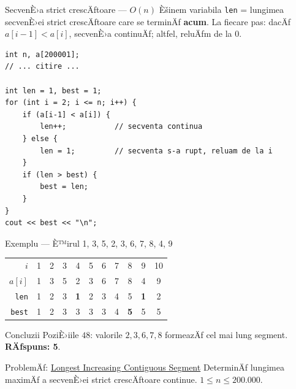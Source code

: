 \documentclass{beamer}
\begin{document}
\begin{frame}{SecvenÈ›a strict crescÄƒtoare --- $O(n)$}
  Èšinem variabila \texttt{len} = lungimea secvenÈ›ei strict crescÄƒtoare care se terminÄƒ \textbf{acum}.
  La fiecare pas: dacÄƒ $a[i-1] < a[i]$, secvenÈ›a continuÄƒ; altfel, reluÄƒm de la 0.
  \begin{lstlisting}
int n, a[200001];
// ... citire ...

int len = 1, best = 1;
for (int i = 2; i <= n; i++) {
    if (a[i-1] < a[i]) {
        len++;           // secventa continua
    } else {
        len = 1;         // secventa s-a rupt, reluam de la i
    }
    if (len > best) {
        best = len;
    }
}
cout << best << "\n";
  \end{lstlisting}
\end{frame}

\begin{frame}{Exemplu --- È™irul 1, 3, 5, 2, 3, 6, 7, 8, 4, 9}
  \begin{center}
  \footnotesize
  \begin{tabular}{r|cccccccccc}
    \toprule
    $i$           & 1 & 2 & 3 & 4          & 5 & 6 & 7 & 8          & 9          & 10 \\
    $a[i]$        & 1 & 3 & 5 & 2          & 3 & 6 & 7 & 8          & 4          & 9  \\
    \texttt{len}  & 1 & 2 & 3 & \textbf{1} & 2 & 3 & 4 & 5          & \textbf{1} & 2  \\
    \texttt{best} & 1 & 2 & 3 & 3          & 3 & 3 & 4 & \textbf{5} & 5          & 5  \\
    \bottomrule
  \end{tabular}
  \end{center}
  \begin{block}{Concluzii}
    PoziÈ›iile $4$\textendash$8$: valorile $2, 3, 6, 7, 8$ formeazÄƒ cel mai lung segment. \textbf{RÄƒspuns: 5}.
  \end{block}
  \begin{block}{ProblemÄƒ: \href{https://code.algolymp.com/problems/4204}{Longest Increasing Contiguous Segment}}
    DeterminÄƒ lungimea maximÄƒ a secvenÈ›ei strict crescÄƒtoare continue. $1 \leq n \leq 200{.}000$.
  \end{block}
\end{frame}
\end{document}
